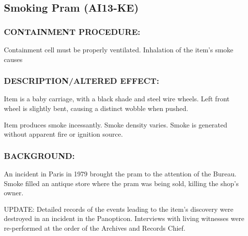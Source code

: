 \subsection*{Smoking Pram (AI13-KE)}
\subsubsection*{CONTAINMENT PROCEDURE:}
\par Containment cell must be properly
ventilated. Inhalation of the item's smoke
causes 
\subsubsection*{DESCRIPTION/ALTERED EFFECT:}
\par Item is a baby carriage, with a black
shade and steel wire wheels. Left front
wheel is slightly bent, causing a distinct
wobble when pushed.
\par Item produces smoke incessantly. Smoke density varies. Smoke is
generated without apparent fire or ignition source.
\subsubsection*{BACKGROUND:}
\par An incident in Paris in 1979 brought the pram to the attention of
the Bureau. Smoke filled an antique store where the pram was
being sold, killing the shop's owner.
\par UPDATE: Detailed records of the events leading to the item's
discovery were destroyed in an incident in the Panopticon.
Interviews with living witnesses were re-performed at the order of
the Archives and Records Chief.